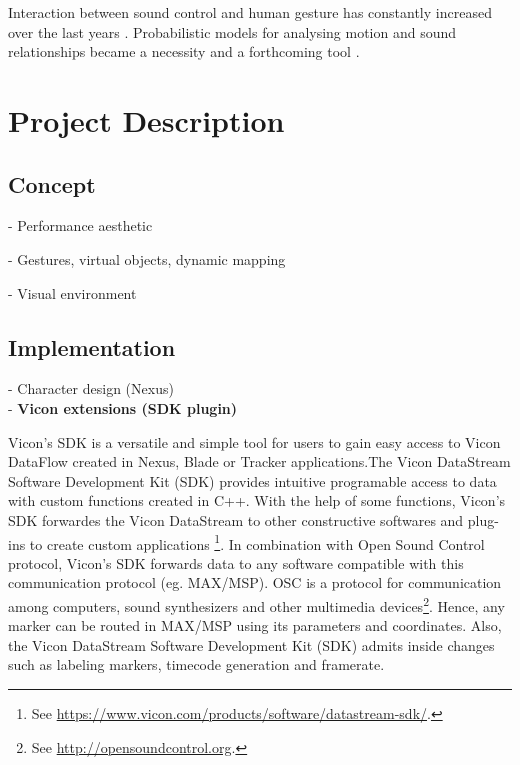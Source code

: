 \documentclass{nime-alternate}
\begin{document}
Interaction between sound control and human gesture has constantly increased over the last years \cite{Gestureanalysis}. Probabilistic models for analysing motion and sound relationships became a necessity and a forthcoming tool \cite{probabilisticmodels}.

\section{Project Description}

\subsection{Concept}

- Performance aesthetic

- Gestures, virtual objects, dynamic mapping

- Visual environment

\subsection{Implementation}
- Character design (Nexus)\\

- \textbf{Vicon extensions (SDK plugin)} \par
Vicon's SDK is a versatile and simple tool for users to gain easy access to Vicon DataFlow created in Nexus, Blade or Tracker applications.The Vicon DataStream Software Development Kit (SDK) provides intuitive programable access to data with custom functions created in C++. With the help of some functions, Vicon's SDK forwardes the Vicon DataStream to other constructive softwares and plug-ins to create custom applications \footnote{See \url{https://www.vicon.com/products/software/datastream-sdk/}.}. In combination with Open Sound Control protocol, Vicon's SDK forwards data to any software compatible with this communication protocol (eg. MAX/MSP). OSC is a protocol for communication among computers, sound synthesizers and other multimedia devices\footnote{See  \url{http://opensoundcontrol.org}.}. Hence, any marker can be routed in MAX/MSP using its parameters and coordinates. Also, the Vicon DataStream Software Development Kit (SDK) admits inside changes such as labeling markers, timecode generation and framerate.
\end{document}
